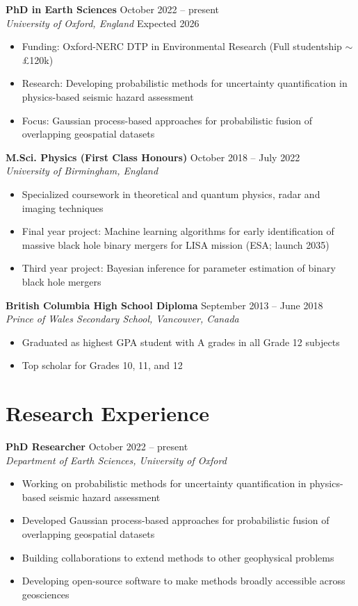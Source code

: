 \documentclass[11pt,a4paper]{article}
\newcommand{\cventry}[4]{%
    \noindent\textbf{#1} \hfill #2\\
    \textit{#3} \hfill #4\\[0.1em]
}
\begin{document}
\cventry{PhD in Earth Sciences}{October 2022 -- present}{University of Oxford, England}{Expected 2026}
\begin{itemize}
    \item Funding: Oxford-NERC DTP in Environmental Research (Full studentship $\sim$£120k)
    \item Research: Developing probabilistic methods for uncertainty quantification in physics-based seismic hazard assessment
    \item Focus: Gaussian process-based approaches for probabilistic fusion of overlapping geospatial datasets
\end{itemize}

\cventry{M.Sci. Physics (First Class Honours)}{October 2018 -- July 2022}{University of Birmingham, England}{}
\begin{itemize}
    \item Specialized coursework in theoretical and quantum physics, radar and imaging techniques
    \item Final year project: Machine learning algorithms for early identification of massive black hole binary mergers for LISA mission (ESA; launch 2035)
    \item Third year project: Bayesian inference for parameter estimation of binary black hole mergers
\end{itemize}

\cventry{British Columbia High School Diploma}{September 2013 -- June 2018}{Prince of Wales Secondary School, Vancouver, Canada}{}
\begin{itemize}
    \item Graduated as highest GPA student with A grades in all Grade 12 subjects
    \item Top scholar for Grades 10, 11, and 12
\end{itemize}

\section*{Research Experience}

\cventry{PhD Researcher}{October 2022 -- present}{Department of Earth Sciences, University of Oxford}{}
\begin{itemize}
    \item Working on probabilistic methods for uncertainty quantification in physics-based seismic hazard assessment
    \item Developed Gaussian process-based approaches for probabilistic fusion of overlapping geospatial datasets
    \item Building collaborations to extend methods to other geophysical problems
    \item Developing open-source software to make methods broadly accessible across geosciences
\end{itemize}
\end{document}

